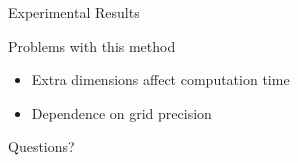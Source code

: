 \documentclass{beamer}
\begin{document}
\begin{frame}{Experimental Results}

\end{frame}

\begin{frame}{Problems with this method}
  \begin{itemize}
  \item Extra dimensions affect computation time
  \item Dependence on grid precision
  \end{itemize}
\end{frame}

\begin{frame}{Questions?}
  
\end{frame}
\end{document}
